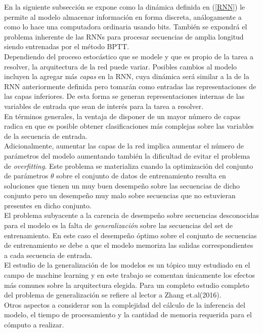 \documentclass{article}
\begin{document}
	En la siguiente subsección se expone como la dinámica definida en (\ref{RNN}) le permite al modelo almacenar información en forma discreta, análogamente a como lo hace una computadora ordinaria usando bits. También se expondrá el problema inherente de las RNNs para procesar secuencias de amplia longitud siendo entrenadas por el método BPTT.\\
	
	Dependiendo del proceso estocástico que se modele y que es propio de la tarea a resolver, la arquitectura de la red puede variar. Posibles cambios al modelo incluyen la agregar más \textit{capas} en la RNN, cuya dinámica será similar a la de la RNN anteriormente definida pero tomarán como entradas las representaciones de las capas inferiores. De esta forma se generan representaciones internas de las variables de entrada\cite{5IntermediateFeatures} que sean de interés para la tarea a resolver.\\
	En términos generales, la ventaja de disponer de un mayor número de capas radica en que es posible obtener clasificaciones más complejas sobre las variables de la secuencia de entrada.\\ Adicionalmente, aumentar las capas de la red implica aumentar el número de parámetros del modelo aumentando también la dificultad de evitar el problema de \textit{overfitting}. Este problema se materializa cuando la optimización del conjunto de parámetros $\theta$ sobre el conjunto de datos de entrenamiento resulta en soluciones que tienen un muy buen desempeño sobre las secuencias de dicho conjunto pero un desempeño muy malo sobre secuencias que no estuvieran presentes en dicho conjunto.\\
	El problema subyacente a la carencia de desempeño sobre secuencias desconocidas para el modelo es la falta de \textit{generalización} sobre las secuencias del set de entrenamiento. En este caso el desempeño óptimo sobre el conjunto de secuencias de entrenamiento se debe a que el modelo memoriza las salidas correspondientes a cada secuencia de entrada.\\
	El estudio de la generalización de los modelos es un tópico muy estudiado en el campo de machine learning y en este trabajo se comentan únicamente los efectos más comunes sobre la arquitectura elegida. Para un completo estudio completo del problema de generalización se refiere al lector a Zhang et.al(2016)\cite{6Generalization}.\\
	
	Otros aspectos a considerar son la complejidad del cálculo de la inferencia del modelo, el tiempo de procesamiento y la cantidad de memoria requerida para el cómputo a realizar.\\
	
\end{document}
